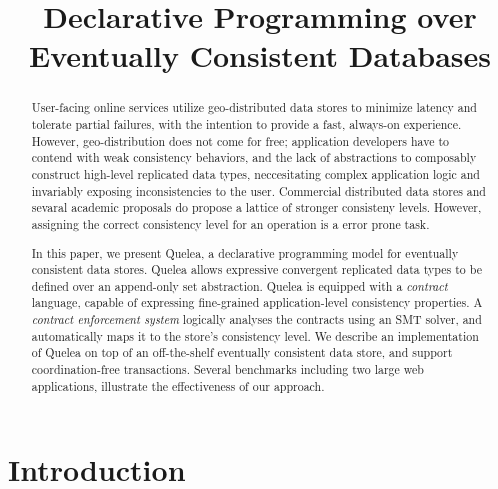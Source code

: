 \documentclass[pldi]{sigplanconf}
\begin{document}
%
%

\title{Declarative Programming over Eventually Consistent Databases }

\maketitle
\begin{abstract}
User-facing online services utilize geo-distributed data stores to minimize
latency and tolerate partial failures, with the intention to provide a fast,
always-on experience. However, geo-distribution does not come for free;
application developers have to contend with weak consistency behaviors, and the
lack of abstractions to composably construct high-level replicated data types,
neccesitating complex application logic and invariably exposing inconsistencies
to the user. Commercial distributed data stores and sevaral academic proposals
do propose a lattice of stronger consisteny levels. However, assigning the
correct consistency level for an operation is a error prone task.

In this paper, we present Quelea, a declarative programming model for
eventually consistent data stores. Quelea allows expressive convergent
replicated data types to be defined over an append-only set abstraction. Quelea
is equipped with a \emph{contract} language, capable of expressing fine-grained
application-level consistency properties. A \emph{contract enforcement system}
logically analyses the contracts using an SMT solver, and automatically maps it
to the store's consistency level. We describe an implementation of Quelea on
top of an off-the-shelf eventually consistent data store, and support
coordination-free transactions. Several benchmarks including two large web
applications, illustrate the effectiveness of our approach.
\end{abstract}

\section{Introduction}
\end{document}

